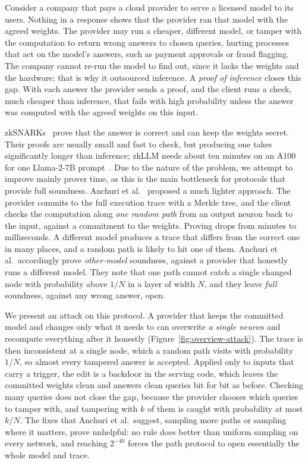 \documentclass[sigconf,nonacm]{acmart}
\begin{document}
Consider a company that pays a cloud provider to serve a licensed model to its users. Nothing in a
response shows that the provider ran that model with the agreed weights. The provider may run a
cheaper, different model, or tamper with the computation to return wrong answers to chosen
queries, hurting processes that act on the model's answers, such as payment approvals or fraud
flagging. The company cannot re-run the model to find out, since it lacks the weights
and the hardware; that is why it outsourced inference. A \emph{proof of inference} closes this
gap. With each answer the provider sends a proof, and the client runs a
check, much cheaper than inference, that fails with high probability unless the answer was
computed with the agreed weights on this input.

zkSNARKs~\cite{zkcnn,zkml,zkllm,zkgpt,deepprove} prove that the answer is correct and can keep
the weights secret. Their proofs are usually small and fast to check, but producing one takes significantly
longer than inference; zkLLM needs
about ten minutes on an A100 for one Llama-2-7B prompt~\cite{zkllm}. Due to the nature of the problem, we attempt to improve mainly prover time, as this is the main bottleneck for protocols that provide full soundness. Anchuri et al.~\cite{anchuri2026verifiable} proposed a much lighter approach. The provider commits to the
full execution trace with a Merkle tree, and the client checks the computation along \emph{one
random path} from an output neuron back to the input, against a commitment to the weights.
Proving drops from minutes to milliseconds. A different model produces a trace that differs from
the correct one in many places, and a random path is likely to hit one of them. Anchuri et al.\
accordingly prove \emph{other-model} soundness, against a provider that honestly runs a different
model. They note that one path cannot catch a single changed node with probability above $1/N$ in
a layer of width $N$, and they leave \emph{full} soundness, against any wrong answer, open.

We present an attack on this protocol. A provider that keeps the
committed model and changes only what it needs to can overwrite \emph{a single neuron} and recompute everything after it honestly
(Figure~\ref{fig:overview-attack}). The trace is then inconsistent at
a single node, which a random path visits with probability $1/N$, so almost every tampered answer is
accepted. Applied only to inputs that carry a trigger, the edit is a backdoor in the serving
code, which leaves the committed weights clean and answers clean queries bit for bit as before.
Checking many queries does not close the gap, because the
provider chooses which queries to tamper with, and tampering with $k$ of them is caught with
probability at most $k/N$. The fixes that Anchuri et al.\ suggest, sampling more paths or
sampling where it matters, prove unhelpful: no rule does better than uniform sampling on every network, and
reaching $2^{-40}$ forces the path protocol to open essentially the whole model and trace.
\end{document}
